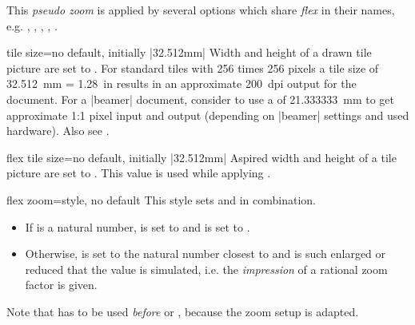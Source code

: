 This \emph{pseudo zoom} is applied by several options which share \emph{flex}
in their names, e.g.
, ,
,
,
.



\begin{docMrcKey}{tile size}{=}{no default, initially |32.512mm|}
  Width and height of a drawn tile picture are set to .
  For standard tiles with 256 times 256 pixels a tile size of
  \SI{32.512}{mm} = \SI{1.28}{in} results in an approximate
  \SI{200}{dpi} output for the document.
  For a |beamer| document, consider to use a  of
  \SI{21.333333}{mm} to get approximate 1:1 pixel input and output (depending on |beamer| settings
  and used hardware). Also see .
\end{docMrcKey}

\begin{docMrcKey}{flex tile size}{=}{no default, initially |32.512mm|}
  Aspired width and height of a tile picture are set to .
  This value is used while applying .
\end{docMrcKey}


\begin{docMrcKey}{flex zoom}{=}{style, no default}
  This style sets  and  in combination.
  \begin{itemize}
  \item
    If  is a natural number,
     is set to  and
     is set to .
  \item Otherwise,  is set to the natural number
    closest to  and  is such
    enlarged or reduced that the  value is simulated,
    i.e. the \emph{impression} of a rational zoom factor is given.
  \end{itemize}
  Note that  has to be used \emph{before}
   or , because the zoom setup is
  adapted.
\end{docMrcKey}


